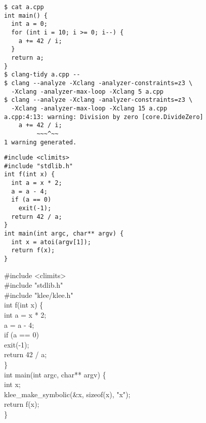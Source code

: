 \documentclass{article}
\begin{document}

{\scriptsize\begin{verbatim}
$ cat a.cpp
int main() {
  int a = 0;
  for (int i = 10; i >= 0; i--) {
    a += 42 / i;
  }
  return a;
}
$ clang-tidy a.cpp --
$ clang --analyze -Xclang -analyzer-constraints=z3 \
  -Xclang -analyzer-max-loop -Xclang 5 a.cpp
$ clang --analyze -Xclang -analyzer-constraints=z3 \
  -Xclang -analyzer-max-loop -Xclang 15 a.cpp
a.cpp:4:13: warning: Division by zero [core.DivideZero]
    a += 42 / i;
         ~~~^~~
1 warning generated.
\end{verbatim}
}

\plush{}



\begin{pptWide}{2}
{\scriptsize\begin{verbatim}
#include <climits>
#include "stdlib.h"
int f(int x) {
  int a = x * 2;
  a = a - 4;
  if (a == 0)
    exit(-1);
  return 42 / a;
}
int main(int argc, char** argv) {
  int x = atoi(argv[1]);
  return f(x);
}
\end{verbatim}
}
\par\columnbreak\par
{\ttfamily\scriptsize
\#include <climits> \\
\#include "stdlib.h" \\
{\color{orange}\#include "klee/klee.h"} \\
int f(int x) \{ \\
\quad  int a = x * 2; \\
\quad  a = a - 4; \\
\quad  if (a == 0) \\
\quad\quad    exit(-1); \\
\quad  return 42 / a; \\
\} \\
int main(int argc, char** argv) \{ \\
{\color{orange}
\quad  int x; \\
\quad  klee\_make\_symbolic(\&x, sizeof(x), "x");} \\
\quad  return f(x); \\
\}}
\end{pptWide}

\plush{}

\end{document}
